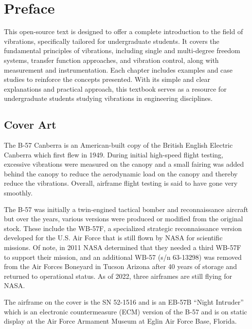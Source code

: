 \documentclass[12pt,letter]{article}
\begin{document}
\pagebreak

\setcounter{secnumdepth}{0} %

\section{Preface}
\vspace{-1ex}
This open-source text is designed to offer a complete introduction to the field of vibrations, specifically tailored for undergraduate students. It covers the fundamental principles of vibrations, including single and multi-degree freedom systems, transfer function approaches, and vibration control, along with measurement and instrumentation. Each chapter includes examples and case studies to reinforce the concepts presented. With its simple and clear explanations and practical approach, this textbook serves as a resource for undergraduate students studying vibrations in engineering disciplines.

\vspace{-1ex}
\subsection{Cover Art}
\vspace{-1ex}
The B-57 Canberra is an American-built copy of the British English Electric Canberra which first flew in 1949. During initial high-speed flight testing, excessive vibrations were measured on the canopy and a small fairing was added behind the canopy to reduce the aerodynamic load on the canopy and thereby reduce the vibrations. Overall, airframe flight testing is said to have gone very smoothly. 

The B-57 was initially a twin-engined tactical bomber and reconnaissance aircraft but over the years, various versions were produced or modified from the original stock. These include the WB-57F, a specialized strategic reconnaissance version developed for the U.S. Air Force that is still flown by NASA for scientific missions. Of note, in 2011 NASA determined that they needed a third WB-57F to support their mission, and an additional WB-57 (s/n 63-13298) was removed from the Air Forces Boneyard in Tucson Arizona after 40 years of storage and returned to operational status. As of 2022, three airframes are still flying for NASA.

The airframe on the cover is the SN 52-1516 and is an EB-57B ``Night Intruder'' which is an electronic countermeasure (ECM) version of the B-57 and is on static display at the Air Force Armament Museum at Eglin Air Force Base, Florida. 
\end{document}
